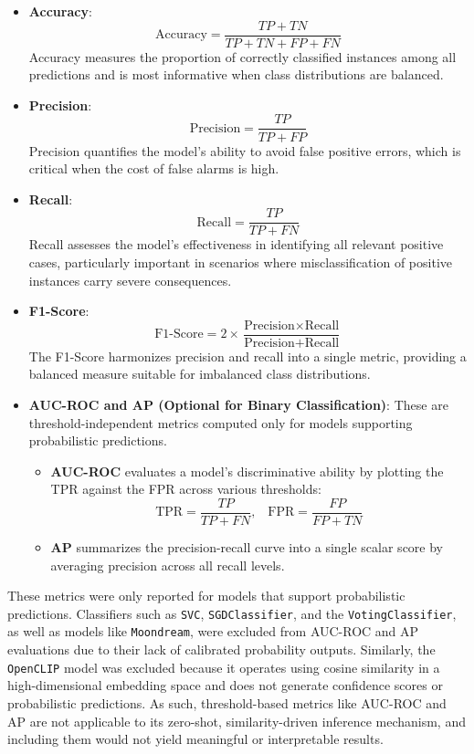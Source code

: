 \begin{itemize}
  \item \textbf{Accuracy}:
  \[
  \text{Accuracy} = \frac{TP + TN}{TP + TN + FP + FN}
  \]
  Accuracy measures the proportion of correctly classified instances among all predictions and is most informative
  when class distributions are balanced.

  \item \textbf{Precision}:
  \[
  \text{Precision} = \frac{TP}{TP + FP}
  \]
  Precision quantifies the model's ability to avoid false positive errors, which is critical when the cost of false
  alarms is high.

  \item \textbf{Recall}:
  \[
  \text{Recall} = \frac{TP}{TP + FN}
  \]
  Recall assesses the model’s effectiveness in identifying all relevant positive cases, particularly important in
  scenarios where misclassification of positive instances carry severe consequences.

  \item \textbf{F1-Score}:
  \[
  \text{F1-Score} = 2 \times \frac{\text{Precision} \times \text{Recall}}{\text{Precision} + \text{Recall}}
  \]
  The F1-Score harmonizes precision and recall into a single metric, providing a balanced measure suitable for
  imbalanced class distributions.

  \item \textbf{\ac{AUC-ROC} and \ac{AP} (Optional for Binary Classification)}: These are
  threshold-independent metrics computed only for models supporting probabilistic predictions.
  \begin{itemize}
      \item \textbf{\ac{AUC-ROC}} evaluates a model’s discriminative ability by plotting the \ac{TPR} against the \ac{FPR} across various thresholds:
      \[
      \text{TPR} = \frac{TP}{TP + FN}\text{,} \quad \text{FPR} = \frac{FP}{FP + TN}
      \]
      \item \textbf{\ac{AP}} summarizes the precision-recall curve into a single scalar score by
      averaging precision across all recall levels.
  \end{itemize}
\end{itemize}

These metrics were only reported for models that support probabilistic predictions. Classifiers such as
\texttt{\ac{SVC}}, \texttt{SGDClassifier}, and the \texttt{VotingClassifier}, as well as models like
\texttt{Moondream}, were excluded from \ac{AUC-ROC} and \ac{AP} evaluations due to their lack of calibrated
probability outputs. Similarly, the \texttt{OpenCLIP} model was excluded because it operates using cosine similarity
in a high-dimensional embedding space and does not generate confidence scores or probabilistic predictions. As such,
threshold-based metrics like \ac{AUC-ROC} and \ac{AP} are not applicable to its zero-shot, similarity-driven inference
mechanism, and including them would not yield meaningful or interpretable results.
\vspace{1em}

